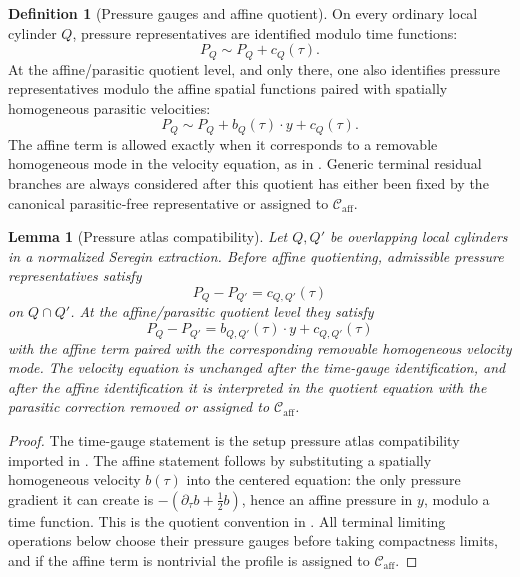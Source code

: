\documentclass[11pt]{amsart}
\numberwithin{equation}{section}
\theoremstyle{plain}
\newtheorem{lemma}[lemma]{Lemma}
\theoremstyle{definition}
\newtheorem{definition}[definition]{Definition}
\theoremstyle{remark}
\newcommand{\Caff}{\mathcal C_{\mathrm{aff}}}
\begin{document}
\begin{definition}[Pressure gauges and affine quotient]
\label{def:pressure-gauge-affine-quotient}
On every ordinary local cylinder \(Q\), pressure representatives are identified
modulo time functions:
\[
   P_Q\sim P_Q+c_Q(\tau).
\]
At the affine/parasitic quotient level, and only there, one also identifies
pressure representatives modulo the affine spatial functions paired with
spatially homogeneous parasitic velocities:
\[
   P_Q\sim P_Q+b_Q(\tau)\cdot y+c_Q(\tau).
\]
The affine term is allowed exactly when it corresponds to a removable
homogeneous mode in the velocity equation, as in
.  Generic terminal residual branches
are always considered after this quotient has either been fixed by the
canonical parasitic-free representative or assigned to \(\Caff\).
\end{definition}

\begin{lemma}[Pressure atlas compatibility]
\label{lem:paperIV-pressure-atlas-compatibility}
Let \(Q,Q'\) be overlapping local cylinders in a normalized Seregin extraction.
Before affine quotienting, admissible pressure representatives satisfy
\[
   P_Q-P_{Q'}=c_{Q,Q'}(\tau)
\]
on \(Q\cap Q'\).  At the affine/parasitic quotient level they satisfy
\[
   P_Q-P_{Q'}=b_{Q,Q'}(\tau)\cdot y+c_{Q,Q'}(\tau)
\]
with the affine term paired with the corresponding removable homogeneous
velocity mode.  The velocity equation is unchanged after the time-gauge
identification, and after the affine identification it is interpreted in the
quotient equation with the parasitic correction removed or assigned to
\(\Caff\).
\end{lemma}

\begin{proof}
The time-gauge statement is the setup pressure atlas compatibility imported in
.  The affine statement follows by substituting
a spatially homogeneous velocity \(b(\tau)\) into the centered equation:
the only pressure gradient it can create is
\(-(\partial_\tau b+\frac12b)\), hence an affine pressure in \(y\), modulo a
time function.  This is the quotient convention in
.  All terminal limiting operations
below choose their pressure gauges before taking compactness limits, and if the
affine term is nontrivial the profile is assigned to \(\Caff\).
\end{proof}
\end{document}
